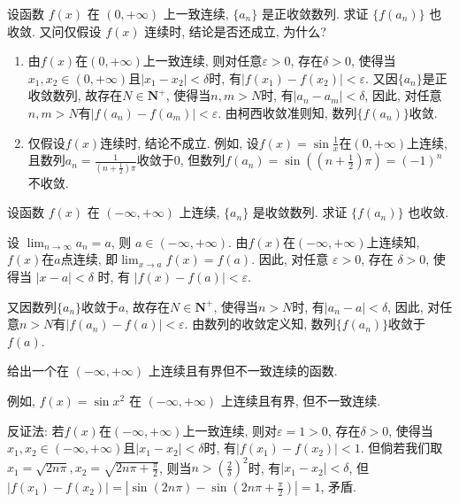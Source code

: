 \begin{exercise}[2.2.14]
    设函数 $f(x)$ 在 $(0, +\infty)$ 上一致连续, $\{a_n\}$ 是正收敛数列. 求证 $\{f(a_n)\}$ 也收敛. 又问仅假设 $f(x)$ 连续时, 结论是否还成立, 为什么?
\end{exercise}

\begin{solution}
    \begin{enumerate}
        \item 由$f(x)$在$(0,+\infty)$上一致连续, 则对任意$\varepsilon>0$, 存在$\delta>0$, 使得当$x_1,x_2\in(0,+\infty)$且$|x_1-x_2|<\delta$时, 有$|f(x_1)-f(x_2)|<\varepsilon$. 
              又因$\{a_n\}$是正收敛数列, 故存在$N\in\mathbf{N}^+$, 使得当$n,m>N$时, 有$|a_n-a_m|<\delta$, 因此, 对任意$n,m>N$有$|f(a_n)-f(a_m)|<\varepsilon$. 由柯西收敛准则知, 数列$\{f(a_n)\}$收敛.
        \item 仅假设$f(x)$连续时, 结论不成立. 例如, 设$f(x)=\sin\frac{1}{x}$在$(0,+\infty)$上连续, 且数列$a_n=\frac{1}{(n+\frac{1}{2})\pi}$收敛于$0$, 但数列$f(a_n)=\sin\left( \left(n+\frac12\right) \pi\right)= (-1)^n$不收敛.
    \end{enumerate}
\end{solution}

\begin{exercise}[2.2.15]
    设函数 $f(x)$ 在 $(-\infty, +\infty)$ 上连续, $\{a_n\}$ 是收敛数列. 求证 $\{f(a_n)\}$ 也收敛.
\end{exercise}

\begin{solution}
    设 $\lim_{n \to \infty} a_n = a$, 则 $a \in (-\infty, +\infty)$. 由$f(x)$在$(-\infty,+\infty)$上连续知,$f(x)$在$a$点连续, 即$\lim_{x \to a} f(x) = f(a)$. 
    因此, 对任意 $\varepsilon > 0$, 存在 $\delta > 0$, 使得当 $|x - a| < \delta$ 时, 有 $|f(x) - f(a)| < \varepsilon$.

    又因数列$\{a_n\}$收敛于$a$, 故存在$N\in\mathbf{N}^+$, 使得当$n>N$时, 有$|a_n-a|<\delta$, 因此, 对任意$n>N$有$|f(a_n)-f(a)|<\varepsilon$. 由数列的收敛定义知, 数列$\{f(a_n)\}$收敛于$f(a)$.
\end{solution}

\begin{exercise}[2.2.16]
    给出一个在 $(-\infty, +\infty)$ 上连续且有界但不一致连续的函数.
\end{exercise}

\begin{solution}
    例如, $f(x) = \sin x^2$ 在 $(-\infty, +\infty)$ 上连续且有界, 但不一致连续. 

    反证法: 若$f(x)$在$(-\infty,+\infty)$上一致连续, 则对$\varepsilon=1>0$, 存在$\delta>0$, 使得当$x_1,x_2\in(-\infty,+\infty)$且$|x_1-x_2|<\delta$时, 有$|f(x_1)-f(x_2)|<1$. 但倘若我们取$x_1=\sqrt{2n\pi}, x_2=\sqrt{2n\pi+\frac{\pi}{2}}$, 则当$n>\left(\frac{2}{\delta}\right)^2$时, 有$|x_1-x_2|<\delta$, 但$|f(x_1)-f(x_2)|=\left|\sin(2n\pi)-\sin\left(2n\pi+\frac{\pi}{2}\right)\right|=1$, 矛盾.
\end{solution}

\newpage